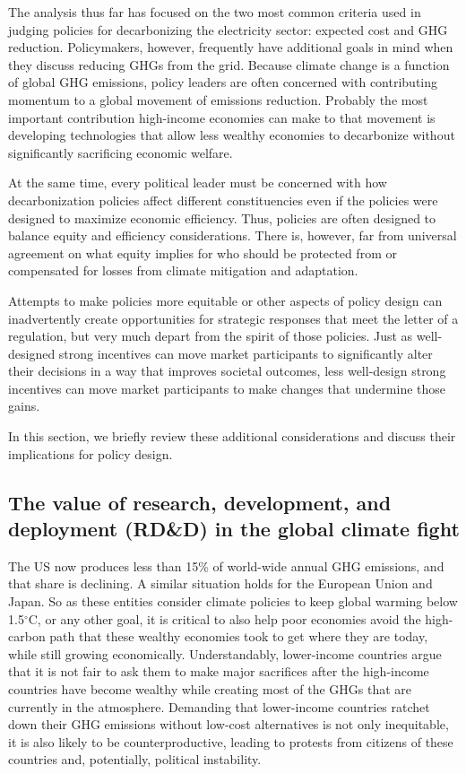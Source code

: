 \documentclass[12pt]{article}
\begin{document}
The analysis thus far has focused on the two most common criteria used in judging policies for decarbonizing the electricity sector: expected cost and GHG reduction.  Policymakers, however, frequently have additional goals in mind when they discuss reducing GHGs from the grid.  Because climate change is a function of global GHG emissions, policy leaders are often concerned with contributing momentum to a global movement of emissions reduction. Probably the most important contribution high-income economies can make to that movement is developing technologies that allow less wealthy economies to decarbonize without significantly sacrificing economic welfare. 

At the same time, every political leader must be concerned with how decarbonization policies affect different constituencies even if the policies were designed to maximize economic efficiency.  Thus, policies are often designed to balance equity and efficiency considerations. There is, however, far from universal agreement on what equity implies for who should be protected from or compensated for losses from climate mitigation and adaptation.

Attempts to make policies more equitable or other aspects of policy design can inadvertently create opportunities for strategic responses that meet the letter of a regulation, but very much depart from the spirit of those policies.  Just as well-designed strong incentives can move market participants to significantly alter their decisions in a way that improves societal outcomes, less well-design strong incentives can move market participants to make changes that undermine those gains.

In this section, we briefly review these additional considerations and discuss their implications for policy design.

\subsection{The value of research, development, and deployment (RD\&D) in the global climate fight}

The US now produces less than 15\% of world-wide annual GHG emissions, and that share is declining. A similar situation holds for the European Union and Japan. So as these entities consider climate policies to keep global warming below 1.5$^\circ$C, or any other goal, it is critical to also help poor economies avoid the high-carbon path that these wealthy economies took to get where they are today, while still growing economically. Understandably, lower-income countries argue that it is not fair to ask them to make major sacrifices after the high-income countries have become wealthy while creating most of the GHGs that are currently in the atmosphere.  Demanding that lower-income countries ratchet down their GHG emissions without low-cost alternatives is not only inequitable, it is also likely to be counterproductive, leading to protests from citizens of these countries and, potentially, political instability.
\end{document}
